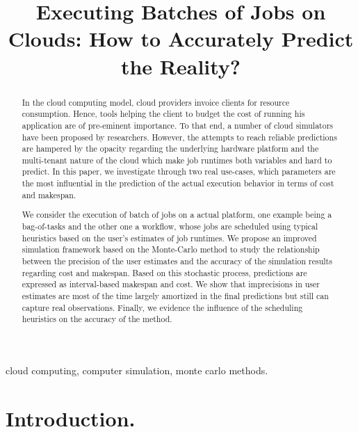 \documentclass[10pt,conference,compsocconf]{IEEEtran}
\title{Executing Batches of Jobs on Clouds: How to Accurately Predict the Reality?}
\author{\IEEEauthorblockN{Luke~Bertot 
			and Stéphane~Genaud 
			and Julien~Gossa}
	\IEEEauthorblockA{Icube-ICPS --- UMR 7357, Univeristé de Strasbourg, CNRS\\
		P\^ole API Blvd S. Bant, 67400 Illkirch\\
		email: \url{lbertot@unistra.fr}, \url{genaud@unistra.fr}, \url{gossa@unistra.fr}}
	}
\begin{document}
\maketitle

\begin{abstract}
  In the  cloud computing  model, cloud providers  invoice clients  for resource
  consumption. Hence, tools helping the client to budget the cost of running his
  application are  of pre-eminent  importance. To  that end,  a number  of cloud
  simulators have been  proposed by researchers. However, the  attempts to reach
  reliable  predictions are  hampered by  the opacity  regarding the  underlying
  hardware platform  and the  multi-tenant nature  of the  cloud which  make job
  runtimes both  variables and hard to  predict.  In this paper,  we investigate
  through two real  use-cases, which parameters are the most  influential in the
  prediction of the actual execution behavior in terms of cost and makespan.

  We consider the execution  of batch of jobs on a  actual platform, one example
  being a  bag-of-tasks and the other  one a workflow, whose  jobs are scheduled
  using typical  heuristics based on  the user's  estimates of job  runtimes.  We
  propose an  improved simulation framework  based on the Monte-Carlo  method to
  study the  relationship between the  precision of  the user estimates  and the
  accuracy of the simulation results regarding  cost and makespan. Based on this
  stochastic process,  predictions are expressed as  interval-based makespan and
  cost.   We show  that imprecisions  in  user estimates  are most  of the  time
  largely amortized in the final predictions but still can capture real
  observations. Finally, we evidence the influence of the scheduling heuristics
  on the accuracy of the method.
 
\end{abstract}

\begin{IEEEkeywords}
cloud computing, computer simulation, monte carlo methods.
\end{IEEEkeywords}

\section{Introduction.}
\end{document}
